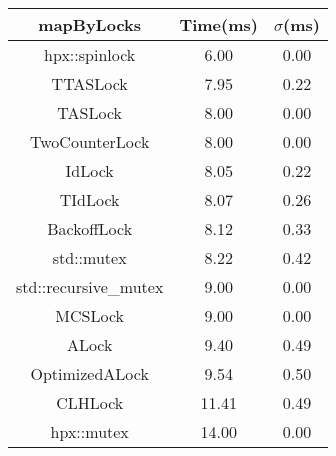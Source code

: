 \begin{tabular}{|c|c|c|}
\hline
\textbf{mapByLocks} & \textbf{Time(ms)} & \textbf{$\sigma$(ms)} \\
\hline
hpx::spinlock & 6.00 & 0.00 \\
\hline
TTASLock & 7.95 & 0.22 \\
\hline
TASLock & 8.00 & 0.00 \\
\hline
TwoCounterLock & 8.00 & 0.00 \\
\hline
IdLock & 8.05 & 0.22 \\
\hline
TIdLock & 8.07 & 0.26 \\
\hline
BackoffLock & 8.12 & 0.33 \\
\hline
std::mutex & 8.22 & 0.42 \\
\hline
std::recursive_mutex & 9.00 & 0.00 \\
\hline
MCSLock & 9.00 & 0.00 \\
\hline
ALock & 9.40 & 0.49 \\
\hline
OptimizedALock & 9.54 & 0.50 \\
\hline
CLHLock & 11.41 & 0.49 \\
\hline
hpx::mutex & 14.00 & 0.00 \\
\hline
\end{tabular}
